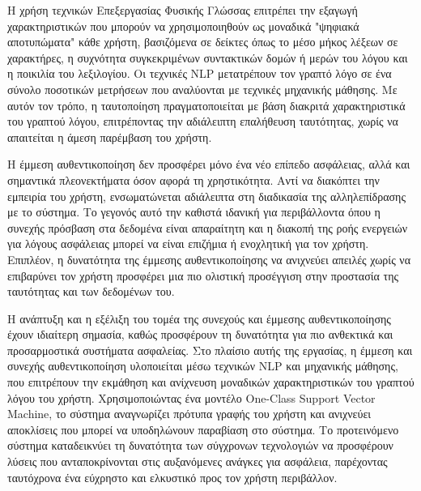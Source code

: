 Η χρήση τεχνικών Επεξεργασίας Φυσικής Γλώσσας επιτρέπει την εξαγωγή χαρακτηριστικών που μπορούν να χρησιμοποιηθούν ως μοναδικά "ψηφιακά αποτυπώματα" κάθε χρήστη, βασιζόμενα σε δείκτες όπως το μέσο μήκος λέξεων σε χαρακτήρες, η συχνότητα συγκεκριμένων συντακτικών δομών ή μερών του λόγου και η ποικιλία του λεξιλογίου. Οι τεχνικές NLP μετατρέπουν τον γραπτό λόγο σε ένα σύνολο ποσοτικών μετρήσεων που αναλύονται με τεχνικές μηχανικής μάθησης. Με αυτόν τον τρόπο, η ταυτοποίηση πραγματοποιείται με βάση διακριτά χαρακτηριστικά του γραπτού λόγου, επιτρέποντας την αδιάλειπτη επαλήθευση ταυτότητας, χωρίς να απαιτείται η άμεση παρέμβαση του χρήστη.

Η έμμεση αυθεντικοποίηση δεν προσφέρει μόνο ένα νέο επίπεδο ασφάλειας, αλλά και σημαντικά πλεονεκτήματα όσον αφορά τη χρηστικότητα. Αντί να διακόπτει την εμπειρία του χρήστη, ενσωματώνεται αδιάλειπτα στη διαδικασία της αλληλεπίδρασης με το σύστημα. Το γεγονός αυτό την καθιστά ιδανική για περιβάλλοντα όπου η συνεχής πρόσβαση στα δεδομένα είναι απαραίτητη και η διακοπή της ροής ενεργειών για λόγους ασφάλειας μπορεί να είναι επιζήμια ή ενοχλητική για τον χρήστη. Επιπλέον, η δυνατότητα της έμμεσης αυθεντικοποίησης να ανιχνεύει απειλές χωρίς να επιβαρύνει τον χρήστη προσφέρει μια πιο ολιστική προσέγγιση στην προστασία της ταυτότητας και των δεδομένων του.

Η ανάπτυξη και η εξέλιξη του τομέα της συνεχούς και έμμεσης αυθεντικοποίησης έχουν ιδιαίτερη σημασία, καθώς προσφέρουν τη δυνατότητα για πιο ανθεκτικά και προσαρμοστικά συστήματα ασφαλείας. Στο πλαίσιο αυτής της εργασίας, η έμμεση και συνεχής αυθεντικοποίηση υλοποιείται μέσω τεχνικών NLP και μηχανικής μάθησης, που επιτρέπουν την εκμάθηση και ανίχνευση μοναδικών χαρακτηριστικών του γραπτού λόγου του χρήστη. Χρησιμοποιώντας ένα μοντέλο One-Class Support Vector Machine, το σύστημα αναγνωρίζει πρότυπα γραφής του χρήστη και ανιχνεύει αποκλίσεις που μπορεί να υποδηλώνουν παραβίαση στο σύστημα. Το προτεινόμενο σύστημα καταδεικνύει τη δυνατότητα των σύγχρονων τεχνολογιών να προσφέρουν λύσεις που ανταποκρίνονται στις αυξανόμενες ανάγκες για ασφάλεια, παρέχοντας ταυτόχρονα ένα εύχρηστο και ελκυστικό προς τον χρήστη περιβάλλον.
